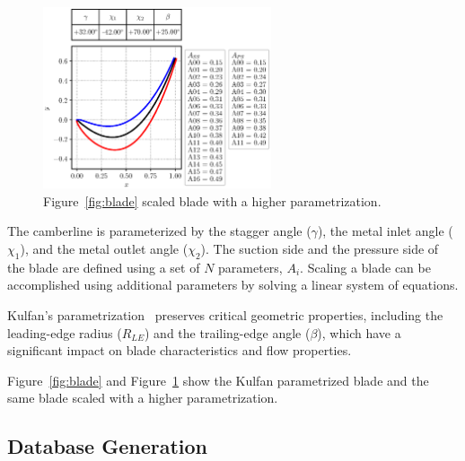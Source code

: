 \documentclass[11pt,a4paper,twocolumn]{article}
\begin{document}
\begin{figure}[!h]
    \centering 
    \hspace*{-1.7cm}
    \includegraphics[width=0.6\textwidth]{pyFigure/figures/scaledBlade.eps}
    \caption{Figure~\ref{fig:blade} scaled blade with a higher parametrization.}
    \label{fig:scaledBlade}
\end{figure}


The camberline is parameterized by the stagger angle ($\gamma$), the metal inlet angle ($\chi_1$), and the metal outlet angle ($\chi_2$). The suction side and the pressure side of the blade are defined using a set of $N$ parameters, $A_i$. Scaling a blade can be accomplished using additional parameters by solving a linear system of equations.

Kulfan's parametrization~\cite{kulfan2008universal} preserves critical geometric properties, including the leading-edge radius ($R_{LE}$) and the trailing-edge angle ($\beta$), which have a significant impact on blade characteristics and flow properties.

Figure~\ref{fig:blade} and Figure~\ref{fig:scaledBlade} show the Kulfan parametrized blade and the same blade scaled with a higher parametrization.

\subsection{Database Generation}
\end{document}
